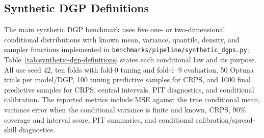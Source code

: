 \subsection{Synthetic DGP Definitions}\label{app:synthetic-dgp-definitions}
The main synthetic DGP benchmark uses five one- or two-dimensional conditional distributions with known mean, variance, quantile, density, and sampler functions implemented in \texttt{benchmarks/pipeline/synthetic\_dgps.py}; Table~\ref{tab:synthetic-dgp-definitions} states each conditional law and its purpose. All use seed $42$, ten folds with fold-0 tuning and fold-1--9 evaluation, 50 Optuna trials per model/DGP, 100 tuning predictive samples for CRPS, and 1000 final predictive samples for CRPS, central intervals, PIT diagnostics, and conditional calibration. The reported metrics include MSE against the true conditional mean, variance error when the conditional variance is finite and known, CRPS, 90\% coverage and interval score, PIT summaries, and conditional calibration/spread-skill diagnostics.

\begin{landscape}
\begin{table}[!p]
\centering
\caption{Synthetic DGP definitions used in the main synthetic benchmark. Here $x$ denotes the observed covariate vector and $\epsilon$ denotes independent noise.}
\label{tab:synthetic-dgp-definitions}
\small
{}
\end{table}
\end{landscape}

